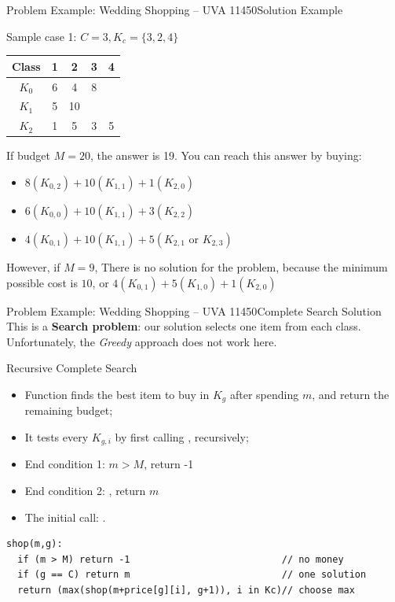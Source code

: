 \begin{frame}{Problem Example: Wedding Shopping -- UVA 11450}{Solution Example}
  \begin{block}{Sample case 1: $C=3, K_c = \{3,2,4\}$}
  \begin{tabular}{|c|cccc|}
    Class & 1 & 2 & 3 & 4\\
    \hline
    $K_0$ & 6 & 4 & 8 & \\
    $K_1$ & 5 & 10 & & \\
    $K_2$ & 1 & 5 & 3 & 5\\
  \end{tabular}
  \end{block}
  \medskip

  If budget $M=20$, the answer is \alert{19}. You can reach this answer by buying:
  \begin{itemize}
    \item $8(K_{0,2})+10(K_{1,1})+1(K_{2,0})$
    \item $6(K_{0,0})+10(K_{1,1})+3(K_{2,2})$
    \item $4(K_{0,1})+10(K_{1,1})+5(K_{2,1} \text{ or } K_{2,3})$
  \end{itemize}
  \bigskip

  However, if $M=9$, There is no solution for the problem, because the minimum possible cost is $10$, or $4(K_{0,1})+5(K_{1,0})+1(K_{2,0})$
\end{frame}

\begin{frame}[fragile]{Problem Example: Wedding Shopping -- UVA 11450}{Complete Search Solution}
  This is a {\bf Search problem}: our solution selects one item from each class. Unfortunately, the \emph{Greedy} approach does not work here.
  \begin{block}{Recursive Complete Search}
    \begin{itemize}
      \item Function  finds the best item to buy in $K_g$ after spending $m$, and return the remaining budget;

      \item It tests every $K_{g,i}$ by first calling , recursively;

      \item End condition 1: $m > M$, return -1
      \item End condition 2: , return $m$
      \item The initial call: .
    \end{itemize}
  \end{block}
{\smaller
\begin{verbatim}
shop(m,g):
  if (m > M) return -1                           // no money
  if (g == C) return m                           // one solution
  return (max(shop(m+price[g][i], g+1)), i in Kc)// choose max
\end{verbatim}}


\end{frame}

